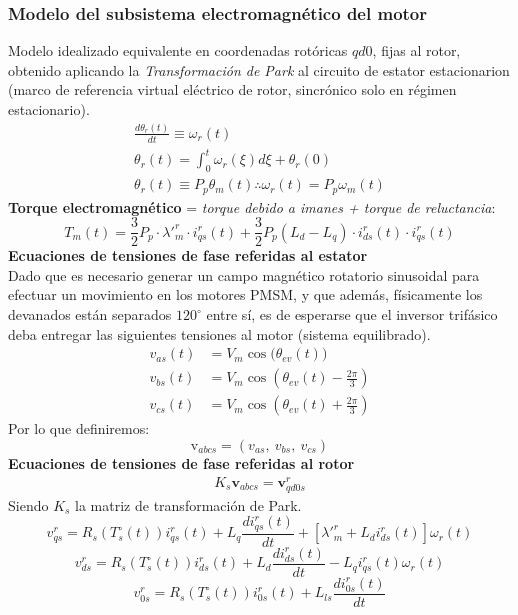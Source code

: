 \documentclass[12pt, a4paper,journal, onecolumn, compsoc]{IEEEtran}
\begin{document}
    \subsubsection{Modelo del subsistema electromagnético del motor}
    Modelo idealizado equivalente en coordenadas rotóricas \(qd0\), fijas al rotor, obtenido aplicando la \textit{Transformación de Park} al circuito de estator estacionarion (marco de referencia virtual eléctrico de rotor, sincrónico solo en régimen estacionario).
    \begin{gather}
        \frac{d\theta_r(t)}{dt} \equiv \omega_r(t) \\
        \theta_r(t)=\int_0^t{\omega_r(\xi)d\xi+\theta_r(0)} \\
        \theta_r(t) \equiv P_p\theta_m(t) \therefore \omega_r(t) = P_p\omega_m(t)
    \end{gather}
    \textbf{Torque electromagnético} = \textit{torque debido a imanes + torque de reluctancia}:
    \begin{equation}
            T_m(t) = \frac{3}{2} P_p \cdot \lambda'^r_m \cdot i^r_{qs}(t) + \frac{3}{2} P_p (L_d-L_q)\cdot i^r_{ds}(t)\cdot i^r_{qs}(t)
            \label{eq:torque_electromagnetico}
    \end{equation}
\textbf{Ecuaciones de tensiones de fase referidas al estator}\\
Dado que es necesario generar un campo magnético rotatorio sinusoidal para efectuar un movimiento en los motores PMSM, y que además, físicamente los devanados están separados \(120^\circ\) entre sí, es de esperarse que el inversor trifásico deba entregar las siguientes tensiones al motor (sistema equilibrado).
\begin{align}
v_{as}(t) &= V_m \cos\big(\theta_{ev}(t)\big) \\
v_{bs}(t) &= V_m \cos\left(\theta_{ev}(t) - \frac{2\pi}{3}\right) \\
v_{cs}(t) &= V_m \cos\left(\theta_{ev}(t) + \frac{2\pi}{3}\right)
\end{align}
Por lo que definiremos:
\[\bm{\mathrm{v}}_{abcs} = (v_{as},\ v_{bs},\ v_{cs})\]
\textbf{Ecuaciones de tensiones de fase referidas al rotor}
    \begin{align}
        K_s\textbf{v}_{abcs} = \textbf{v}^r_{qd0s}
    \end{align}
    Siendo \(K_s\) la matriz de transformación de Park.
    \begin{equation}\label{eq:vqs_rotor}
        v^r_{qs}=R_s(T_s^\circ(t))i^r_{qs}(t) + L_q\frac{d i^r_{qs}(t)}{dt}+[\lambda'^r_m + L_d i^r_{ds}(t)]\omega_r(t)
    \end{equation}
    \begin{equation}\label{eq:vds_rotor}
        v_{ds}^r=R_s(T_s^\circ(t))i^r_{ds}(t)+L_d\frac{d i^r_{ds}(t)}{dt} - L_qi^r_{qs}(t)\omega_r(t)
    \end{equation}
    \begin{equation}\label{eq:v0s_rotor}
        v^r_{0s}=R_s(T_s^\circ(t))i^r_{0s}(t)+L_{ls}\frac{d i^r_{0s}(t)}{dt}
    \end{equation}
\end{document}
